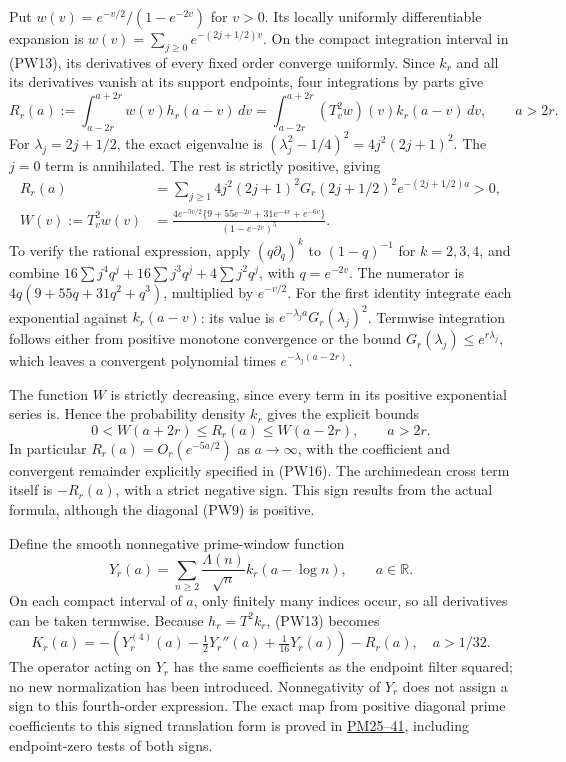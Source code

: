 \documentclass[
  10pt,
  a4paper,
]{article}
\begin{document}
Put \(w(v)=e^{-v/2}/(1-e^{-2v})\) for \(v>0\). Its locally uniformly
differentiable expansion is \(w(v)=\sum_{j\ge0}e^{-(2j+1/2)v}\). On the
compact integration interval in (PW13), its derivatives of every fixed
order converge uniformly. Since \(k_r\) and all its derivatives vanish
at its support endpoints, four integrations by parts give \[
 R_r(a):=\int_{a-2r}^{a+2r}w(v)h_r(a-v)\,dv
 =\int_{a-2r}^{a+2r}(T_v^2w)(v)k_r(a-v)\,dv,
 \qquad a>2r.
\tag{PW15}
\] For \(\lambda_j=2j+1/2\), the exact eigenvalue is
\((\lambda_j^2-1/4)^2=4j^2(2j+1)^2\). The \(j=0\) term is annihilated.
The rest is strictly positive, giving \[
\begin{aligned}
 R_r(a)&=\sum_{j\ge1}4j^2(2j+1)^2G_r(2j+1/2)^2e^{-(2j+1/2)a}>0,\\
 W(v):=T_v^2w(v)
 &=\frac{4e^{-5v/2}\{9+55e^{-2v}+31e^{-4v}+e^{-6v}\}}
         {(1-e^{-2v})^5}.
\end{aligned}
\tag{PW16}
\] To verify the rational expression, apply \((q\partial_q)^k\) to
\((1-q)^{-1}\) for \(k=2,3,4\), and combine
\(16\sum j^4q^j+16\sum j^3q^j+4\sum j^2q^j\), with \(q=e^{-2v}\). The
numerator is \(4q(9+55q+31q^2+q^3)\), multiplied by \(e^{-v/2}\). For
the first identity integrate each exponential against \(k_r(a-v)\): its
value is \(e^{-\lambda_j a}G_r(\lambda_j)^2\). Termwise integration
follows either from positive monotone convergence or the bound
\(G_r(\lambda_j)\le e^{r\lambda_j}\), which leaves a convergent
polynomial times \(e^{-\lambda_j(a-2r)}\).

The function \(W\) is strictly decreasing, since every term in its
positive exponential series is. Hence the probability density \(k_r\)
gives the explicit bounds \[
 0<W(a+2r)\le R_r(a)\le W(a-2r),\qquad a>2r.
\tag{PW17}
\] In particular \(R_r(a)=O_r(e^{-5a/2})\) as \(a\to\infty\), with the
coefficient and convergent remainder explicitly specified in (PW16). The
archimedean cross term itself is \(-R_r(a)\), with a strict negative
sign. This sign results from the actual formula, although the diagonal
(PW9) is positive.

Define the smooth nonnegative prime-window function \[
 Y_r(a)=\sum_{n\ge2}\frac{\Lambda(n)}{\sqrt n}k_r(a-\log n),
 \qquad a\in\mathbb R.
\tag{PW18}
\] On each compact interval of \(a\), only finitely many indices occur,
so all derivatives can be taken termwise. Because \(h_r=T^2k_r\), (PW13)
becomes \[
 \boxed{K_r(a)=-\left(Y_r^{(4)}(a)-\tfrac12Y_r''(a)
                       +\tfrac1{16}Y_r(a)\right)-R_r(a),\quad a>1/32.}
\tag{PW19}
\] The operator acting on \(Y_r\) has the same coefficients as the
endpoint filter squared; no new normalization has been introduced.
Nonnegativity of \(Y_r\) does not assign a sign to this fourth-order
expression. The exact map from positive diagonal prime coefficients to
this signed translation form is proved in
\href{PRIME_PROJECTOR_MOBIUS_DERIVATION.md}{PM25--41}, including
endpoint-zero tests of both signs.
\end{document}
